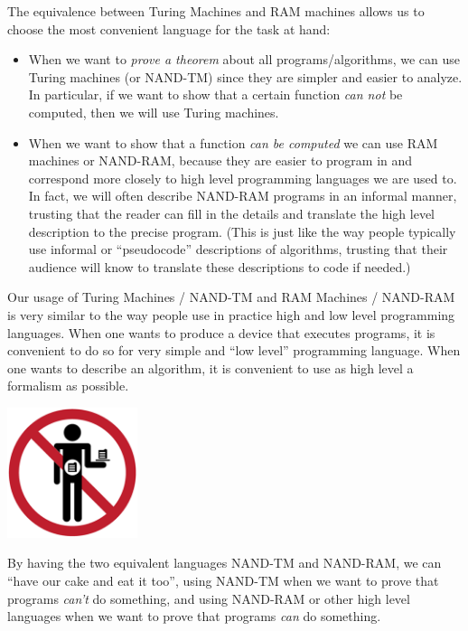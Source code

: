 The equivalence between Turing Machines and RAM machines allows us to
choose the most convenient language for the task at hand:

\begin{itemize}
\item
  When we want to \emph{prove a theorem} about all programs/algorithms,
  we can use Turing machines (or NAND-TM) since they are simpler and
  easier to analyze. In particular, if we want to show that a certain
  function \emph{can not} be computed, then we will use Turing machines.
\item
  When we want to show that a function \emph{can be computed} we can use
  RAM machines or NAND-RAM, because they are easier to program in and
  correspond more closely to high level programming languages we are
  used to. In fact, we will often describe NAND-RAM programs in an
  informal manner, trusting that the reader can fill in the details and
  translate the high level description to the precise program. (This is
  just like the way people typically use informal or ``pseudocode''
  descriptions of algorithms, trusting that their audience will know to
  translate these descriptions to code if needed.)
\end{itemize}

Our usage of Turing Machines / NAND-TM and RAM Machines / NAND-RAM is
very similar to the way people use in practice high and low level
programming languages. When one wants to produce a device that executes
programs, it is convenient to do so for very simple and ``low level''
programming language. When one wants to describe an algorithm, it is
convenient to use as high level a formalism as possible.


\begin{marginfigure}
\centering
\includegraphics[width=\linewidth, height=1.5in, keepaspectratio]{../figure/have_your_cake_and_eat_it_too-img-intro.png}
\caption{By having the two equivalent languages NAND-TM and NAND-RAM, we
can ``have our cake and eat it too'', using NAND-TM when we want to
prove that programs \emph{can't} do something, and using NAND-RAM or
other high level languages when we want to prove that programs
\emph{can} do something.}
\label{cakefig}
\end{marginfigure}

